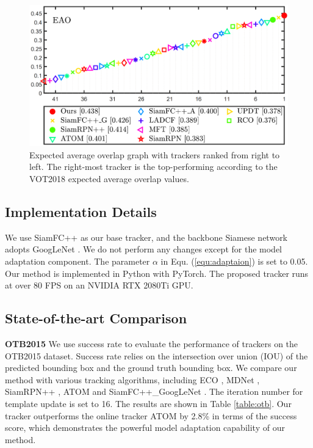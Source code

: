 \begin{figure}[t]
    \centering
    \includegraphics[width=1.0\textwidth]{Img/MTP/vot18/vot18_eao.png}
    \caption{Expected average overlap graph with trackers ranked from right to left. The right-most tracker is the top-performing according to the VOT2018 expected average overlap values.}
    \label{fig:eao}
\end{figure}

\subsection{Implementation Details}
We use SiamFC++ \cite{SiamFC++} as our base tracker, and the backbone Siamese network adopts GoogLeNet \cite{GoogLeNet}. We do not perform any changes except for the model adaptation component. The parameter $\alpha$ in Equ. (\ref{equ:adaptaion}) is set to 0.05. Our method is implemented in Python with PyTorch. The proposed tracker runs at over 80 FPS on an NVIDIA RTX 2080Ti GPU.

\subsection{State-of-the-art Comparison}
\textbf{OTB2015} We use success rate to evaluate the performance of trackers on the OTB2015 dataset. Success rate relies on the intersection over union (IOU) of the predicted bounding box and the ground truth bounding box. We compare our method with various tracking algorithms, including ECO \cite{danelljan2017eco}, MDNet \cite{nam2016learning}, SiamRPN++ \cite{SiamRPN++}, ATOM \cite{danelljan2019atom} and SiamFC++\_GoogLeNet \cite{SiamFC++}. The iteration number for template update is set to 16. The results are shown in Table \ref{table:otb}. Our tracker outperforms the online tracker ATOM by 2.8\% in terms of the success score, which demonstrates the powerful model adaptation capability of our method.

